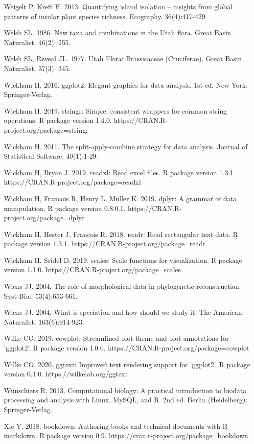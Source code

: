 Weigelt P, Kreft H. 2013. Quantifying island isolation – insights from global patterns of insular plant species richness. Ecography. 36(4):417-429.

Welsh SL. 1986. New taxa and combinations in the Utah flora. Great Basin Naturalist. 46(2): 255.

Welsh SL, Reveal JL. 1977. Utah Flora: Brassicaceae (Cruciferae). Great Basin Naturalist. 37(3): 345.

Wickham H. 2016. ggplot2: Elegant graphics for data analysis. 1st ed. New York: Springer-Verlag.

Wickham H. 2019. stringr: Simple, consistent wrappers for common string operations. R package version 1.4.0. https://CRAN.R-project.org/package=stringr

Wickham H. 2011. The split-apply-combine strategy for data analysis. Journal of Statistical Software. 40(1):1-29.

Wickham H, Bryan J. 2019. readxl: Read excel files. R package version 1.3.1. https://CRAN.R-project.org/package=readxl

Wickham H, Francois R, Henry L, Müller K. 2019. dplyr: A grammar of data manipulation. R package version 0.8.0.1. https://CRAN.R-project.org/package=dplyr

Wickham H, Hester J, Francois R. 2018. readr: Read rectangular text data. R package version 1.3.1. https://CRAN.R-project.org/package=readr

Wickham H, Seidel D. 2019. scales: Scale functions for visualization. R package version 1.1.0. https://CRAN.R-project.org/package=scales

Wiens JJ. 2004. The role of morphological data in phylogenetic reconstruction. Syst Biol. 53(4):653-661.

Wiens JJ. 2004. What is speciation and how should we study it. The American Naturalist. 163(6):914-923.

Wilke CO. 2019. cowplot: Streamlined plot theme and plot annotations for 'ggplot2'. R package version 1.0.0. https://CRAN.R-project.org/package=cowplot

Wilke CO. 2020. ggtext: Improved text rendering support for 'ggplot2'. R package version 0.1.0. https://wilkelab.org/ggtext

Wünschiers R. 2013. Computational biology: A practical introduction to biodata processing and analysis with Linux, MySQL, and R. 2nd ed. Berlin (Heidelberg): Springer-Verlag.

Xie Y. 2018. bookdown: Authoring books and technical documents with R markdown. R package version 0.9. https://cran.r-project.org/package=bookdown

